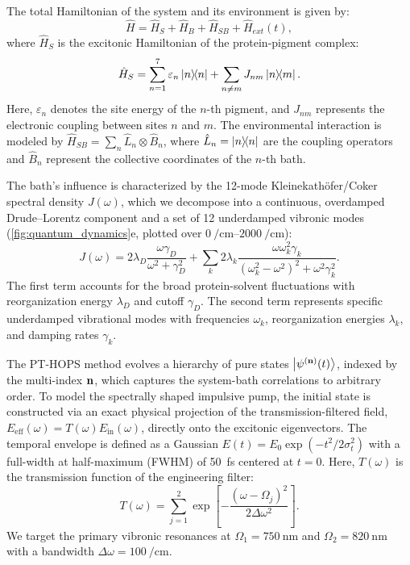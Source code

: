 \documentclass[journal=jpcl,manuscript=letter]{achemso}
\begin{document}
The total Hamiltonian of the system and its environment is given by:
\begin{equation}
\hat{H} = \hat{H}_S + \hat{H}_B + \hat{H}_{SB} + \hat{H}_{ext}(t),
\label{eq:total_hamiltonian}
\end{equation}
where $\hat{H}_S$ is the excitonic Hamiltonian of the protein-pigment complex:
\begin{equation}
\hat{H}_S = \sum_{n=1}^{7} \varepsilon_n \dyad{n} + \sum_{n \neq m} J_{nm} \dyad{n}{m}.
\label{eq:excitonic_hamiltonian}
\end{equation}
Here, $\varepsilon_n$ denotes the site energy of the $n$-th pigment, and $J_{nm}$ represents the electronic coupling between sites $n$ and $m$. The environmental interaction is modeled by $\hat{H}_{SB} = \sum_n \hat{L}_n \otimes \hat{B}_n$, where $\hat{L}_n = \dyad{n}$ are the coupling operators and $\hat{B}_n$ represent the collective coordinates of the $n$-th bath.

The bath's influence is characterized by the 12-mode Kleinekath\"ofer/Coker spectral density $J(\omega)$,\cite{Olbrich2011,Coker2011} which we decompose into a continuous, overdamped Drude--Lorentz component and a set of 12 underdamped vibronic modes (\cref{fig:quantum_dynamics}e, plotted over $\SIrange{0}{2000}{\per\centi\meter}$):
\begin{equation}
J(\omega) = 2\lambda_D \frac{\omega \gamma_D}{\omega^2 + \gamma_D^2} + \sum_{k} 2\lambda_k \frac{\omega \omega_k^2 \gamma_k}{(\omega_k^2 - \omega^2)^2 + \omega^2 \gamma_k^2}.
\label{eq:spectral_density}
\end{equation}
The first term accounts for the broad protein-solvent fluctuations with reorganization energy $\lambda_D$ and cutoff $\gamma_D$. The second term represents specific underdamped vibrational modes with frequencies $\omega_k$, reorganization energies $\lambda_k$, and damping rates $\gamma_k$.

The PT-HOPS method evolves a hierarchy of pure states $\ket{\psi^{(\vb{n})}(t)}$, indexed by the multi-index $\vb{n}$, which captures the system-bath correlations to arbitrary order. To model the spectrally shaped impulsive pump, the initial state is constructed via an exact physical projection of the transmission-filtered field, $E_{\mathrm{eff}}(\omega) = T(\omega) E_{\mathrm{in}}(\omega)$, directly onto the excitonic eigenvectors. The temporal envelope is defined as a Gaussian $E(t) = E_0 \exp(-t^2/2\sigma_t^2)$ with a full-width at half-maximum (FWHM) of \SI{50}{\femto\second} centered at $t = 0$. Here, $T(\omega)$ is the transmission function of the engineering filter:
\begin{equation}
T(\omega) = \sum_{j=1}^2 \exp\left[ -\frac{(\omega - \Omega_{j})^2}{2\Delta\omega^2} \right].
\label{eq:transmission_function}
\end{equation}
We target the primary vibronic resonances at $\Omega_1 = \SI{750}{\nano\meter}$ and $\Omega_2 = \SI{820}{\nano\meter}$ with a bandwidth $\Delta\omega = \SI{100}{\per\centi\meter}$.
\end{document}
